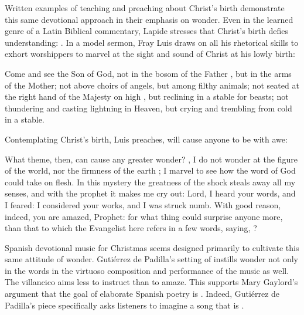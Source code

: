 Written examples of teaching and preaching about Christ's birth demonstrate this
same devotional approach in their emphasis on wonder.
Even in the learned genre of a Latin Biblical commentary, Lapide stresses that
Christ's birth defies understanding: 
.%
    \Autocite
    [50, on ]
    {Lapide:Gospels19C}
In a model sermon, Fray Luis draws on all his rhetorical skills to exhort
worshippers to marvel at the sight and sound of Christ at his lowly birth:
\begin{quoting}
    Come and see the Son of God, not in the bosom of the Father , but
    in the arms of the Mother; not above choirs of angels, but among filthy
    animals; not seated at the right hand of the Majesty on high ,
    but reclining in a stable for beasts; not thundering and casting lightning
    in Heaven, but crying and trembling from cold in a stable.%
        \Autocite[37]{LuisdeGranada:Xmas}
\end{quoting}
Contemplating Christ's birth, Luis preaches, will cause anyone to be
 with awe:
\begin{quoting}
    What theme, then, can cause any greater wonder? \Dots{} 
    , I do not wonder at the figure of the world, nor
    the firmness of the earth \Dots{}; I marvel to see how the word of God could
    take on flesh. \Dots{} 
    In this mystery the greatness of the shock steals away all my senses, and
    with the prophet  it makes me cry out: Lord, I heard your words,
    and I feared: I considered your works, and I was struck numb.
    With good reason, indeed, you are amazed, Prophet: for what thing could
    surprise anyone more, than that to which the Evangelist here refers in a few
    words, saying, ?%
        \Autocite[38]{LuisdeGranada:Xmas}
\end{quoting}


Spanish devotional music for Christmas seems designed primarily to cultivate
this same attitude of wonder.
Gutiérrez de Padilla's setting of  instills
wonder not only in the words in the virtuoso composition and performance of the
music as well.
The villancico aims less to instruct than to amaze. 
This supports Mary Gaylord's argument that the goal of elaborate Spanish poetry
is .%
    \Autocite[227]{Gaylord:Poetry}
Indeed, Gutiérrez de Padilla's piece specifically asks listeners to imagine a
song that is .

